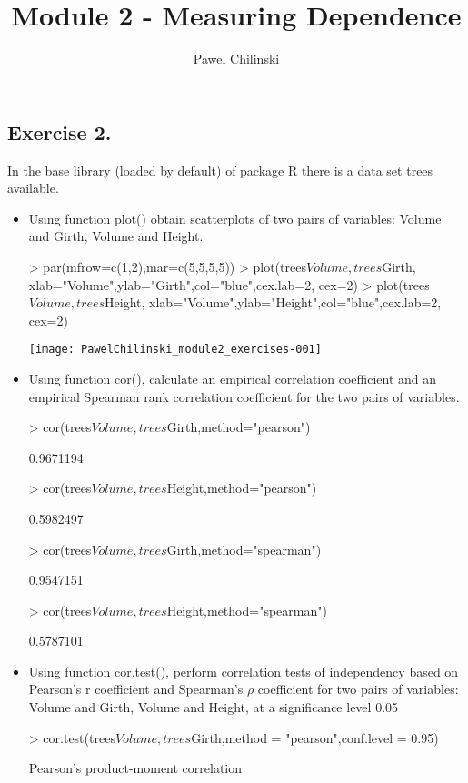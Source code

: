 \documentclass[a4paper]{article}
\title{Module 2 - Measuring Dependence}
\author{Pawel Chilinski}
\begin{document}

\maketitle
\subsection{Exercise 2.}
In the base library (loaded by default) of package R there is a data set trees available.
\begin{itemize}
\item Using function plot() obtain scatterplots of two pairs of variables:
Volume and Girth, Volume and Height.
\begin{Schunk}
\begin{Sinput}
> par(mfrow=c(1,2),mar=c(5,5,5,5))
> plot(trees$Volume,trees$Girth, xlab="Volume",ylab="Girth",col="blue",cex.lab=2, cex=2)
> plot(trees$Volume,trees$Height, xlab="Volume",ylab="Height",col="blue",cex.lab=2, cex=2)
\end{Sinput}
\end{Schunk}
\texttt{[image: PawelChilinski\_module2\_exercises-001]}
\item Using function cor(), calculate an empirical correlation coefficient and
an empirical Spearman rank correlation coefficient for the two pairs of variables.
\begin{Schunk}
\begin{Sinput}
> cor(trees$Volume,trees$Girth,method="pearson")
\end{Sinput}
\begin{Soutput}
[1] 0.9671194
\end{Soutput}
\begin{Sinput}
> cor(trees$Volume,trees$Height,method="pearson")	
\end{Sinput}
\begin{Soutput}
[1] 0.5982497
\end{Soutput}
\begin{Sinput}
> cor(trees$Volume,trees$Girth,method="spearman")
\end{Sinput}
\begin{Soutput}
[1] 0.9547151
\end{Soutput}
\begin{Sinput}
> cor(trees$Volume,trees$Height,method="spearman")
\end{Sinput}
\begin{Soutput}
[1] 0.5787101
\end{Soutput}
\end{Schunk}
\item Using function cor.test(), perform correlation tests of independency based
on Pearson's r coefficient and Spearman's $\rho$ coefficient for two pairs of
variables: Volume and Girth, Volume and Height, at a significance level 0.05
\begin{Schunk}
\begin{Sinput}
> cor.test(trees$Volume,trees$Girth,method = "pearson",conf.level = 0.95)
\end{Sinput}
\begin{Soutput}
	Pearson's product-moment correlation


\end{Soutput}
\end{Schunk}
\end{itemize}
\end{document}
